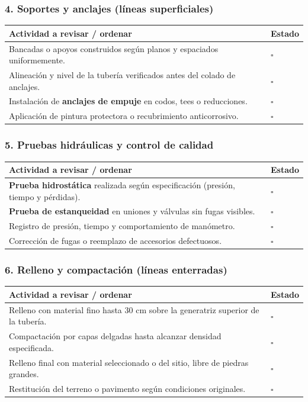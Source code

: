 \documentclass[12pt]{article}
\newcommand{\cbox}{\(\square\)} %
\begin{document}
	\subsubsection*{4. Soportes y anclajes (líneas superficiales)}
	\begin{tabularx}{\linewidth}{>{\raggedright\arraybackslash}p{0.93\linewidth} >{\centering\arraybackslash}m{0.07\linewidth}}
		\toprule
		\textbf{Actividad a revisar / ordenar} & \textbf{Estado}\\
		\midrule
		Bancadas o apoyos construidos según planos y espaciados uniformemente. & \cbox \\
		Alineación y nivel de la tubería verificados antes del colado de anclajes. & \cbox \\
		Instalación de \textbf{anclajes de empuje} en codos, tees o reducciones. & \cbox \\
		Aplicación de pintura protectora o recubrimiento anticorrosivo. & \cbox \\
		\bottomrule
	\end{tabularx}
	
	\subsubsection*{5. Pruebas hidráulicas y control de calidad}
	\begin{tabularx}{\linewidth}{>{\raggedright\arraybackslash}p{0.93\linewidth} >{\centering\arraybackslash}m{0.07\linewidth}}
		\toprule
		\textbf{Actividad a revisar / ordenar} & \textbf{Estado}\\
		\midrule
		\textbf{Prueba hidrostática} realizada según especificación (presión, tiempo y pérdidas). & \cbox \\
		\textbf{Prueba de estanqueidad} en uniones y válvulas sin fugas visibles. & \cbox \\
		Registro de presión, tiempo y comportamiento de manómetro. & \cbox \\
		Corrección de fugas o reemplazo de accesorios defectuosos. & \cbox \\
		\bottomrule
	\end{tabularx}
	
	\subsubsection*{6. Relleno y compactación (líneas enterradas)}
	\begin{tabularx}{\linewidth}{>{\raggedright\arraybackslash}p{0.93\linewidth} >{\centering\arraybackslash}m{0.07\linewidth}}
		\toprule
		\textbf{Actividad a revisar / ordenar} & \textbf{Estado}\\
		\midrule
		Relleno con material fino hasta 30 cm sobre la generatriz superior de la tubería. & \cbox \\
		Compactación por capas delgadas hasta alcanzar densidad especificada. & \cbox \\
		Relleno final con material seleccionado o del sitio, libre de piedras grandes. & \cbox \\
		Restitución del terreno o pavimento según condiciones originales. & \cbox \\
		\bottomrule
	\end{tabularx}
	
\end{document}
